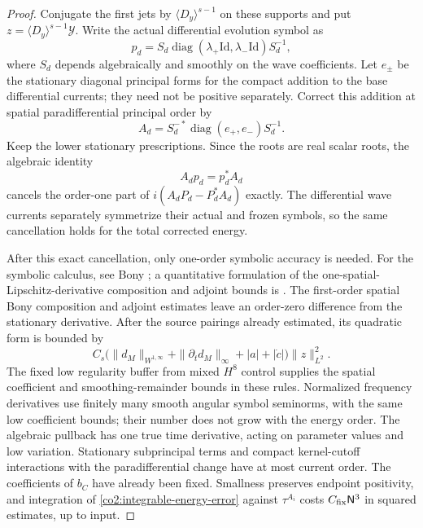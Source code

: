 \begin{proof}
Conjugate the first jets by $\langle D_y\rangle^{s-1}$ on these supports
and put $z=\langle D_y\rangle^{s-1}\mathcal Y$.  Write the actual
differential evolution symbol as
\[
 p_d=S_d\operatorname{diag}(\lambda_+\mathrm{Id},\lambda_-\mathrm{Id})S_d^{-1},
\]
where $S_d$ depends algebraically and smoothly on the wave coefficients.
Let $e_\pm$ be the stationary diagonal principal forms for the compact
addition to the base differential currents; they need not be positive
separately.  Correct this addition at spatial paradifferential principal
order by
\begin{equation}\label{co2:algebraic-pullback}
 A_d=S_d^{-*}\operatorname{diag}(e_+,e_-)S_d^{-1}.
\end{equation}
Keep the lower stationary prescriptions.  Since the roots are real scalar
roots, the algebraic identity
\begin{equation}\label{co2:principal-symmetrization}
 A_dp_d=p_d^*A_d
\end{equation}
cancels the order-one part of $i(A_dP_d-P_d^*A_d)$ exactly.  The
differential wave currents separately symmetrize their actual and frozen
symbols, so the same cancellation holds for the total corrected energy.

After this exact cancellation, only one-order symbolic accuracy is needed.
For the symbolic calculus, see Bony
\cite[\S 3, Theorems~3.2--3.3]{Bony1981}; a quantitative formulation
of the one-spatial-Lipschitz-derivative composition and adjoint bounds is
\cite[Definition~2.1 and Theorem~2.6(ii)--(iii), $\rho=1$]{AlazardBurqZuily2014}.
The first-order spatial Bony composition and adjoint estimates
\cite[Theorems~2.4.11--2.4.12]{Metivier2003} leave an order-zero
difference from the stationary derivative.  After the source
pairings already estimated, its quadratic form is bounded by
\begin{equation}\label{co2:integrable-energy-error}
 C_s\bigl(\|d_M\|_{W^{1,\infty}}+\|\partial_td_M\|_\infty
                  +|a|+|\dot c|\bigr)\|z\|_{L^2}^2.
\end{equation}
The fixed low regularity buffer from mixed $H^8$ control supplies the
spatial coefficient and smoothing-remainder bounds in these rules.
Normalized frequency derivatives use finitely many smooth angular symbol
seminorms, with the same low coefficient bounds; their number does not grow
with the energy order.  The algebraic pullback has one true time derivative,
acting on parameter values and low variation.  Stationary subprincipal terms
and compact kernel-cutoff interactions with the paradifferential change have
at most current order.  The coefficients of $b_C$ have already been fixed.
Smallness preserves endpoint positivity, and integration of
\eqref{co2:integrable-energy-error} against $\tau^{A_i}$ costs
$C_{\rm fix}\mathsf N^3$ in squared estimates, up to input.


\end{proof}

